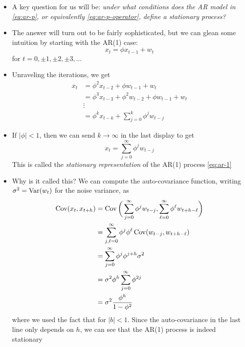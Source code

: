 \documentclass{article}
\begin{document}
\begin{itemize}
\item A key question for us will be: \emph{under what conditions does the AR
    model  in \eqref{eq:ar-p}, or equivalently \eqref{eq:ar-p-operator}, define
    a stationary process?} 

\item The answer will turn out to be fairly sophisticated, but we can glean some
  intuition by starting with the AR(1) case: 
  \begin{equation}
  \label{eq:ar-1}
  x_t = \phi x_{t-1} + w_t 
  \end{equation}
  for  $t = 0, \pm 1, \pm 2, \pm 3, \dots$ 

\item Unraveling the iterations, we get
  \begin{align*}
  x_t &= \phi^2 x_{t-2} + \phi w_{t-1} + w_t \\
  &= \phi^3 x_{t-3} + \phi^2 w_{t-2} + \phi w_{t-1} + w_t \\  
  &\vdots \\ 
  &= \phi^k x_{t-k} + \sum_{j=0}^k \phi^j w_{t-j} 
  \end{align*}

\item If $|\phi| < 1$, then we can send $k \to \infty$ in the last display to 
  get 
  \begin{equation}
  \label{eq:ar-1-stationary}
  x_t = \sum_{j=0}^\infty \phi^j w_{t-j} 
  \end{equation}
  This is called the \emph{stationary representation} of the AR(1) process
  \eqref{eq:ar-1} 

\item Why is it called this? We can compute the auto-covariance function,
  writing $\sigma^2 = \operatorname{Var}(w_t)$ for the noise variance, as
  \begin{align}
  \nonumber
  \operatorname{Cov}(x_t, x_{t+h}) &= \operatorname{Cov}\bigg( \sum_{j=0}^\infty \phi^j w_{t-j}, 
  \sum_{\ell=0}^\infty \phi^\ell w_{t+h-\ell} \bigg) \\
  \nonumber
  &= \sum_{j,\ell=0}^\infty \phi^j \phi^\ell \operatorname{Cov}( w_{t-j}, w_{t+h-\ell} ) \\ 
  \nonumber
  &= \sum_{j=0}^\infty \phi^j \phi^{j+h} \sigma^2 \\
  \nonumber
  &= \sigma^2 \phi^h \sum_{j=0}^\infty \phi^{2j} \\
  \label{eq:ar-1-auto-cov}
  &= \sigma^2 \frac{\phi^h}{1 - \phi^2}    
  \end{align}
  where we used the fact that  for $|b|
  < 1$. Since the auto-covariance in the last line only depends on $h$, we can
  see that the AR(1) process is indeed stationary


\end{itemize}
\end{document}
